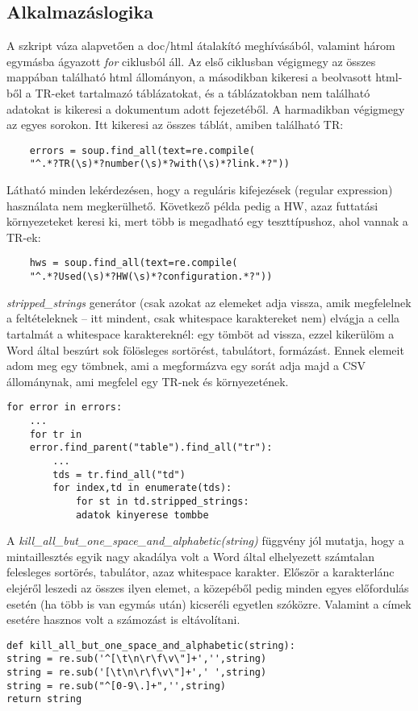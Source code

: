 \documentclass[a4paper,oneside,12pt]{article}
\begin{document}
\subsection{Alkalmazáslogika}
	A szkript váza alapvetően a doc/html átalakító meghívásából, valamint három egymásba ágyazott \emph{for} ciklusból áll. Az első ciklusban végigmegy az összes mappában található html állományon, a másodikban kikeresi a beolvasott html-ből a TR-eket tartalmazó táblázatokat, és a táblázatokban nem található adatokat is kikeresi a dokumentum adott fejezetéből. A harmadikban végigmegy az egyes sorokon. Itt kikeresi az összes táblát, amiben található TR:
	\begin{lstlisting}
	errors = soup.find_all(text=re.compile(
	"^.*?TR(\s)*?number(\s)*?with(\s)*?link.*?"))
	\end{lstlisting}
	Látható minden lekérdezésen, hogy a reguláris kifejezések (regular expression) használata nem megkerülhető. Következő példa pedig a HW, azaz futtatási környezeteket keresi ki, mert több is megadható egy teszttípushoz, ahol vannak a TR-ek:
	\begin{lstlisting}
	hws = soup.find_all(text=re.compile(
	"^.*?Used(\s)*?HW(\s)*?configuration.*?"))
	\end{lstlisting}
	\emph{stripped\_strings} generátor (csak azokat az elemeket adja vissza, amik megfelelnek a feltételeknek -- itt mindent, csak whitespace karaktereket nem) elvágja a cella tartalmát a whitespace karaktereknél: egy tömböt ad vissza, ezzel kikerülöm a Word által beszúrt sok fölösleges sortörést, tabulátort, formázást. Ennek elemeit adom meg egy tömbnek, ami a megformázva egy sorát adja majd a CSV állománynak, ami megfelel egy TR-nek és környezetének.
	\begin{lstlisting}
for error in errors:
	...
	for tr in 
	error.find_parent("table").find_all("tr"):
		...
		tds = tr.find_all("td")
		for index,td in enumerate(tds):
			for st in td.stripped_strings:
			adatok kinyerese tombbe
	\end{lstlisting}
	A \emph{kill\_all\_but\_one\_space\_and\_alphabetic(string)} függvény jól mutatja, hogy a mintaillesztés egyik nagy akadálya volt a Word által elhelyezett számtalan felesleges sortörés, tabulátor, azaz whitespace karakter. Először a karakterlánc elejéről leszedi az összes ilyen elemet, a közepéből pedig minden egyes előfordulás esetén (ha több is van egymás után) kicseréli egyetlen szóközre. Valamint a címek esetére hasznos volt a számozást is eltávolítani.
	\begin{lstlisting}
def kill_all_but_one_space_and_alphabetic(string):
string = re.sub('^[\t\n\r\f\v\"]+','',string)
string = re.sub('[\t\n\r\f\v\"]+',' ',string)
string = re.sub("^[0-9\.]+",'',string)
return string
	\end{lstlisting}
\end{document}
